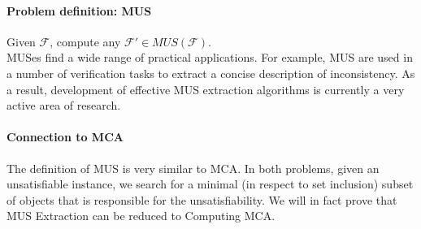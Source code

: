 \documentclass[]{article}
\begin{document}
	\paragraph{Problem definition: MUS} Given $ \mathcal{F} $, compute any $ \mathcal{F}' \in MUS(\mathcal{F}) $. \\
	
	MUSes find a wide range of practical applications. For example, MUS are used in a number of verification tasks to extract a concise description of inconsistency. As a result, development of effective MUS extraction algorithms is currently a very active area of research\cite{Rotation}.
	
	\paragraph{Connection to MCA} The definition of MUS is very similar to MCA. In both problems, given an unsatisfiable instance, we search for a minimal (in respect to set inclusion) subset of objects that is responsible for the unsatisfiability. We will in fact prove that MUS Extraction can be reduced to Computing MCA.
	
\end{document}
